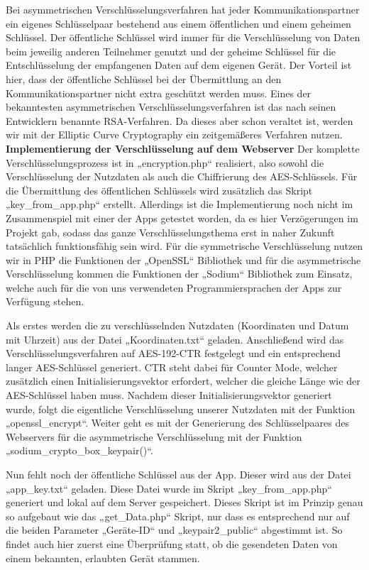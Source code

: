 Bei asymmetrischen Verschlüsselungsverfahren hat jeder Kommunikationspartner ein eigenes Schlüsselpaar bestehend aus einem öffentlichen und einem geheimen Schlüssel. Der öffentliche Schlüssel wird immer für die Verschlüsselung von Daten beim jeweilig anderen Teilnehmer genutzt und der geheime Schlüssel für die Entschlüsselung der empfangenen Daten auf dem eigenen Gerät. Der Vorteil ist hier, dass der öffentliche Schlüssel bei der Übermittlung an den Kommunikationspartner nicht extra geschützt werden muss. Eines der bekanntesten asymmetrischen Verschlüsselungsverfahren ist das nach seinen Entwicklern benannte RSA-Verfahren. Da dieses aber schon veraltet ist, werden wir mit der Elliptic Curve Cryptography ein zeitgemäßeres Verfahren nutzen.
\\
\textbf{Implementierung der Verschlüsselung auf dem Webserver }Der komplette Verschlüsselungsprozess ist in „encryption.php“ realisiert, also sowohl die Verschlüsselung der Nutzdaten als auch die Chiffrierung des AES-Schlüssels. Für die Übermittlung des öffentlichen Schlüssels wird zusätzlich das Skript „key\_from\_app.php“ erstellt. Allerdings ist die Implementierung noch nicht im Zusammenspiel mit einer der Apps getestet worden, da es hier Verzögerungen im Projekt gab, sodass das ganze Verschlüsselungsthema erst in naher Zukunft tatsächlich funktionsfähig sein wird. Für die symmetrische Verschlüsselung nutzen wir in PHP die Funktionen der „OpenSSL“ Bibliothek und für die asymmetrische Verschlüsselung kommen die Funktionen der „Sodium“ Bibliothek zum Einsatz, welche auch für die von uns verwendeten Programmiersprachen der Apps zur Verfügung stehen.

Als erstes werden die zu verschlüsselnden Nutzdaten (Koordinaten und Datum mit Uhrzeit) aus der Datei „Koordinaten.txt“ geladen. Anschließend wird das Verschlüsselungsverfahren auf AES-192-CTR festgelegt und ein entsprechend langer AES-Schlüssel generiert. CTR steht dabei für Counter Mode, welcher zusätzlich einen Initialisierungsvektor erfordert, welcher die gleiche Länge wie der AES-Schlüssel haben muss. Nachdem dieser Initialisierungsvektor generiert wurde, folgt die eigentliche Verschlüsselung unserer Nutzdaten mit der Funktion „openssl\_encrypt“. Weiter geht es mit der Generierung des Schlüsselpaares des Webservers für die asymmetrische Verschlüsselung mit der Funktion „sodium\_crypto\_box\_keypair()“.

Nun fehlt noch der öffentliche Schlüssel aus der App. Dieser wird aus der Datei „app\_key.txt“ geladen. Diese Datei wurde im Skript „key\_from\_app.php“ generiert und lokal auf dem Server gespeichert. Dieses Skript ist im Prinzip genau so aufgebaut wie das „get\_Data.php“ Skript, nur dass es entsprechend nur auf die beiden Parameter „Geräte-ID“ und „keypair2\_public“ abgestimmt ist. So findet auch hier zuerst eine Überprüfung statt, ob die gesendeten Daten von einem bekannten, erlaubten Gerät stammen.

